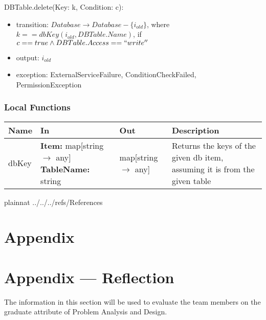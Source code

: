 \documentclass[12pt, titlepage]{article}
\begin{document}
\noindent DBTable.delete(Key: k, Condition: c):
\begin{itemize}
  \item transition: $Database \rightarrow Database - \{i_{old}\}$, where
    $k==dbKey(i_{old}, DBTable.Name)$, if $c == true \land
    DBTable.Access == ``write''$
  \item output: $i_{old}$
  \item exception: ExternalServiceFailure, ConditionCheckFailed,
    PermissionException
\end{itemize}

\subsubsection{Local Functions}

\begin{center}
  \begin{tabular}{>{\raggedright}p{2cm} >{\raggedright}p{5cm}
    >{\raggedright}p{3.5cm} p{4.5cm}}
    \hline
    \textbf{Name} & \textbf{In} & \textbf{Out} & \textbf{Description} \\
    \hline
    dbKey & \textbf{Item:} map[string $\rightarrow$ any] \newline
    \textbf{TableName:} string & map[string $\rightarrow$ any] &
    Returns the keys of the given db item, assuming it is from the
    given table \\
    \hline
  \end{tabular}
\end{center}

\newpage

 {plainnat}
 {../../../refs/References}

\newpage

\section{Appendix} \label{Appendix}


\newpage{}

\section*{Appendix --- Reflection}


The information in this section will be used to evaluate the team members on the
graduate attribute of Problem Analysis and Design.
\end{document}
